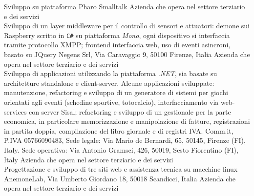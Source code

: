\documentclass[totpages,openbib,italian]{europecv}
\begin{document}
\begin{europecv}
{Sviluppo su piattaforma Pharo Smalltalk}
{Azienda che opera nel settore terziario e dei servizi}
\\
{Sviluppo di un layer middleware per il controllo di sensori e 
    attuatori: demone sui Raspberry scritto in \texttt{C\#} su
    piattaforma \emph{Mono}, ogni dispositivo si interfaccia
    tramite protocollo XMPP; frontend interfaccia web, uso di 
    eventi asincroni, basato su JQuery}
{Negens Srl, Via Caravaggio 9, 50100 Firenze, Italia}
{Azienda che opera nel settore terziario e dei servizi}
\\
{Sviluppo di applicazioni utilizzando la piattaforma \emph{.NET}, 
  sia basate su architetture standalone e client-server. Alcune applicazioni
  sviluppate: manutenzione, refactoring e sviluppo di un generatore di sistemi
  per giochi orientati agli eventi (schedine sportive, totocalcio), interfacciamento
  via web-services con server Sisal; refactoring e sviluppo di un gestionale 
  per la parte economica, in particolare memorizzazione e manipolazione
  di fatture, registrazioni in partita doppia, compilazione del libro giornale
  e di registri IVA.}
{Comm.it, P.IVA 05766090483, Sede legale: Via Mario de Bernardi, 65,
  50145, Firenze (FI), Italy. Sede operativa: Via Antonio Gramsci,
  426,
  50019, Sesto Fiorentino (FI), Italy }
{Azienda che opera nel settore terziario e dei servizi}
\\
{Progettazione e sviluppo di tre siti web e assistenza tecnica su
  macchine linux}
{AnemoneLab, Via Umberto Giordano 18, 50018 Scandicci, Italia}
{Azienda che opera nel settore terziario e dei servizi}
\\

\end{europecv}
\end{document}
